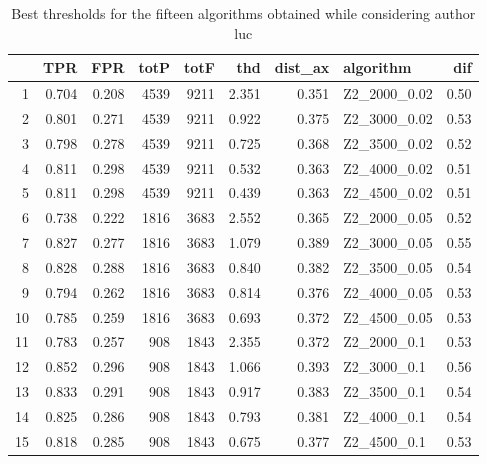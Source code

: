 \documentclass{article}\usepackage[]{graphicx}\usepackage[]{color}
\begin{document}
\begin{table}[ht]
\centering
\begin{tabular}{rrrrrrrlr}
  \hline
 & TPR & FPR & totP & totF & thd & dist\_ax & algorithm & dif \\ 
  \hline
1 & 0.704 & 0.208 & 4539 & 9211 & 2.351 & 0.351 & Z2\_2000\_0.02 & 0.50 \\ 
  2 & 0.801 & 0.271 & 4539 & 9211 & 0.922 & 0.375 & Z2\_3000\_0.02 & 0.53 \\ 
  3 & 0.798 & 0.278 & 4539 & 9211 & 0.725 & 0.368 & Z2\_3500\_0.02 & 0.52 \\ 
  4 & 0.811 & 0.298 & 4539 & 9211 & 0.532 & 0.363 & Z2\_4000\_0.02 & 0.51 \\ 
  5 & 0.811 & 0.298 & 4539 & 9211 & 0.439 & 0.363 & Z2\_4500\_0.02 & 0.51 \\ 
  6 & 0.738 & 0.222 & 1816 & 3683 & 2.552 & 0.365 & Z2\_2000\_0.05 & 0.52 \\ 
  7 & 0.827 & 0.277 & 1816 & 3683 & 1.079 & 0.389 & Z2\_3000\_0.05 & 0.55 \\ 
  8 & 0.828 & 0.288 & 1816 & 3683 & 0.840 & 0.382 & Z2\_3500\_0.05 & 0.54 \\ 
  9 & 0.794 & 0.262 & 1816 & 3683 & 0.814 & 0.376 & Z2\_4000\_0.05 & 0.53 \\ 
  10 & 0.785 & 0.259 & 1816 & 3683 & 0.693 & 0.372 & Z2\_4500\_0.05 & 0.53 \\ 
  11 & 0.783 & 0.257 & 908 & 1843 & 2.355 & 0.372 & Z2\_2000\_0.1 & 0.53 \\ 
  12 & 0.852 & 0.296 & 908 & 1843 & 1.066 & 0.393 & Z2\_3000\_0.1 & 0.56 \\ 
  13 & 0.833 & 0.291 & 908 & 1843 & 0.917 & 0.383 & Z2\_3500\_0.1 & 0.54 \\ 
  14 & 0.825 & 0.286 & 908 & 1843 & 0.793 & 0.381 & Z2\_4000\_0.1 & 0.54 \\ 
  15 & 0.818 & 0.285 & 908 & 1843 & 0.675 & 0.377 & Z2\_4500\_0.1 & 0.53 \\ 
   \hline
\end{tabular}
\caption{Best thresholds for the fifteen algorithms obtained while considering author luc} 
\label{tab:bestluc}
\end{table}
\end{document}
